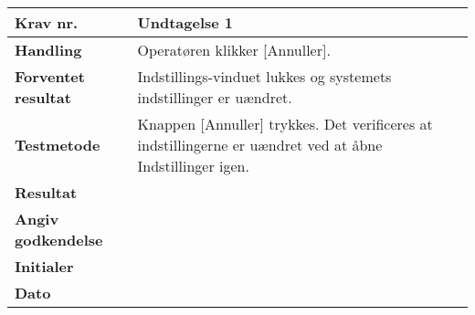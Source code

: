 	\begin{center}
		\begin{longtable}{ | m{4cm}| m{8.5cm}|} 
			\hline
			\textbf{Krav nr.} & Undtagelse 1 \\ 
			\hline
			\textbf{Handling} & Operatøren klikker [Annuller].  \\
			\hline
			\textbf{Forventet resultat} & Indstillings-vinduet lukkes og systemets indstillinger er uændret.  \\
			\hline
			\textbf{Testmetode}  & Knappen [Annuller] trykkes. Det verificeres at indstillingerne er uændret ved at åbne Indstillinger igen.  \\
			\hline
			\textbf{Resultat}  &    \\
			\hline
			\textbf{Angiv godkendelse} &     \\
			\hline
			\textbf{Initialer} &     \\
			\hline
			\textbf{Dato} &    \\
			\hline
		\end{longtable}
	\end{center}